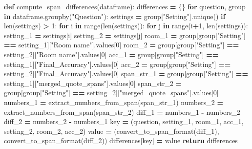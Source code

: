 \documentclass[
]{article}
\newenvironment{Shaded}{\begin{snugshade}}{\end{snugshade}}
\newcommand{\BuiltInTok}[1]{#1}
\newcommand{\ControlFlowTok}[1]{\textcolor[rgb]{0.13,0.29,0.53}{\textbf{#1}}}
\newcommand{\DecValTok}[1]{\textcolor[rgb]{0.00,0.00,0.81}{#1}}
\newcommand{\KeywordTok}[1]{\textcolor[rgb]{0.13,0.29,0.53}{\textbf{#1}}}
\newcommand{\NormalTok}[1]{#1}
\newcommand{\OperatorTok}[1]{\textcolor[rgb]{0.81,0.36,0.00}{\textbf{#1}}}
\newcommand{\StringTok}[1]{\textcolor[rgb]{0.31,0.60,0.02}{#1}}
\begin{document}
\begin{Shaded}
\begin{Highlighting}[]
\KeywordTok{def}\NormalTok{ compute\_span\_differences(dataframe):}
\NormalTok{    differences }\OperatorTok{=}\NormalTok{ \{\}}
    \ControlFlowTok{for}\NormalTok{ question, group }\KeywordTok{in}\NormalTok{ dataframe.groupby(}\StringTok{"Question"}\NormalTok{):}
\NormalTok{        settings }\OperatorTok{=}\NormalTok{ group[}\StringTok{"Setting"}\NormalTok{].unique()}
        \ControlFlowTok{if} \BuiltInTok{len}\NormalTok{(settings) }\OperatorTok{\textgreater{}} \DecValTok{1}\NormalTok{:}
            \ControlFlowTok{for}\NormalTok{ i }\KeywordTok{in} \BuiltInTok{range}\NormalTok{(}\BuiltInTok{len}\NormalTok{(settings)):}
                \ControlFlowTok{for}\NormalTok{ j }\KeywordTok{in} \BuiltInTok{range}\NormalTok{(i}\OperatorTok{+}\DecValTok{1}\NormalTok{, }\BuiltInTok{len}\NormalTok{(settings)):}
\NormalTok{                    setting\_1 }\OperatorTok{=}\NormalTok{ settings[i]}
\NormalTok{                    setting\_2 }\OperatorTok{=}\NormalTok{ settings[j]}
\NormalTok{                    room\_1 }\OperatorTok{=}\NormalTok{ group[group[}\StringTok{"Setting"}\NormalTok{] }\OperatorTok{==}\NormalTok{ setting\_1][}\StringTok{"Room name"}\NormalTok{].values[}\DecValTok{0}\NormalTok{]}
\NormalTok{                    room\_2 }\OperatorTok{=}\NormalTok{ group[group[}\StringTok{"Setting"}\NormalTok{] }\OperatorTok{==}\NormalTok{ setting\_2][}\StringTok{"Room name"}\NormalTok{].values[}\DecValTok{0}\NormalTok{]}
\NormalTok{                    acc\_1 }\OperatorTok{=}\NormalTok{ group[group[}\StringTok{"Setting"}\NormalTok{] }\OperatorTok{==}\NormalTok{ setting\_1][}\StringTok{"Final\_Accuracy"}\NormalTok{].values[}\DecValTok{0}\NormalTok{]}
\NormalTok{                    acc\_2 }\OperatorTok{=}\NormalTok{ group[group[}\StringTok{"Setting"}\NormalTok{] }\OperatorTok{==}\NormalTok{ setting\_2][}\StringTok{"Final\_Accuracy"}\NormalTok{].values[}\DecValTok{0}\NormalTok{]}
\NormalTok{                    span\_str\_1 }\OperatorTok{=}\NormalTok{ group[group[}\StringTok{"Setting"}\NormalTok{] }\OperatorTok{==}\NormalTok{ setting\_1][}\StringTok{"merged\_quote\_spans"}\NormalTok{].values[}\DecValTok{0}\NormalTok{]}
\NormalTok{                    span\_str\_2 }\OperatorTok{=}\NormalTok{ group[group[}\StringTok{"Setting"}\NormalTok{] }\OperatorTok{==}\NormalTok{ setting\_2][}\StringTok{"merged\_quote\_spans"}\NormalTok{].values[}\DecValTok{0}\NormalTok{]}
\NormalTok{                    numbers\_1 }\OperatorTok{=}\NormalTok{ extract\_numbers\_from\_span(span\_str\_1)}
\NormalTok{                    numbers\_2 }\OperatorTok{=}\NormalTok{ extract\_numbers\_from\_span(span\_str\_2)}
\NormalTok{                    diff\_1 }\OperatorTok{=}\NormalTok{ numbers\_1 }\OperatorTok{{-}}\NormalTok{ numbers\_2}
\NormalTok{                    diff\_2 }\OperatorTok{=}\NormalTok{ numbers\_2 }\OperatorTok{{-}}\NormalTok{ numbers\_1}
\NormalTok{                    key }\OperatorTok{=}\NormalTok{ (question, setting\_1, room\_1, acc\_1, setting\_2, room\_2, acc\_2)}
\NormalTok{                    value }\OperatorTok{=}\NormalTok{ (convert\_to\_span\_format(diff\_1), convert\_to\_span\_format(diff\_2))}
\NormalTok{                    differences[key] }\OperatorTok{=}\NormalTok{ value}
    \ControlFlowTok{return}\NormalTok{ differences}


\end{Highlighting}
\end{Shaded}
\end{document}

